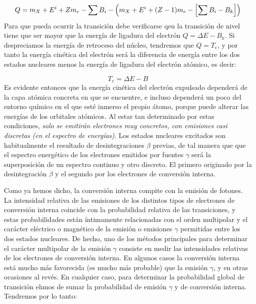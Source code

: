 \begin{equation}
	Q = m_X + E^i + Zm_e - \sum B_i - \left( m_X + E^i + (Z-1)m_e - \left[ \sum B_i - B_k \right] \right)
\end{equation}
Para que pueda ocurrir la transición debe verificarse qeu la transición de nivel tiene que ser mayor que la energía de ligadura del electrón $Q=\Delta E - B_k$. Si despreciamos la energía de retroceso del núcleo, tendremos que $Q=T_e$, y por tanto la energía cinética del electrón será la diferencia de energía entre los dos estados nucleares menos la energía de ligadura del electrón atómico, es decir:

\begin{equation}
	T_e = \Delta E - B
\end{equation}
Es evidente entonces que la energía cinética del electrón expulsado dependerá de la capa atómica concreta en que se encuentre, e incluso dependerá un poco del entorno químico en el que esté inmerso el propio átomo, porque puede alterar las energías de los orbitales atómicos. Al estar tan determinado por estas condiciones, \textit{solo se emitirán electrones muy concretos, con emisiones casi discretas (en el espectro de energías)}. Los estados nucleares excitados son habitualmente el resultado de desintegraciones $\beta$ previas, de tal manera que que el espectro energético de los electrones emitidos por fuentes $\gamma$ será la superposición de un espectro continuo y otro discreto. El primero originado por la desintegración $\beta$ y el segundo por los electrones de conversión interna.

Como ya hemos dicho, la conversión interna compite con la emisión de fotones. La intensidad relativa de las emisiones de los distintos tipos de electrones de conversión interna coincide con la probabilidad relativa de las transiciones, y estas probabilidades están íntimamente relacionadas con el orden multipolar y el carácter eléctrico o magnético de la emisión o emisiones $\gamma$ permitidas entre los dos estados nucleares. De hecho, uno de los métodos principales para determinar el carácter multipolar de la emisión $\gamma$ consiste en medir las intensidades relativas de los electrones de conversión interna. En algunos casos la conversión interna está mucho más favorecida (es mucho más probable) que la emisión $\gamma$, y en otras ocasiones al revés. En cualquier caso, para determinar la probabilidad global de transición ehmos de sumar la probabilidad de emisión $\gamma$ y de conversión interna. Tendremos por lo tanto:

